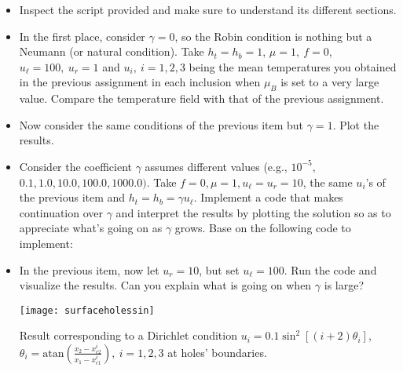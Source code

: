 \begin{kaobox}[frametitle=Implement the following modifications to \texttt{variants\_poisson.py}]

\begin{itemize}
\item Inspect the script provided and make sure to understand its different sections.\\

\item In the first place, consider $\gamma = 0$, so the Robin condition is nothing but a
Neumann (or natural condition). Take $h_t = h_b = 1$, $\mu = 1,~f = 0$, $u_{\ell} = 100,~u_r=1$ and $u_i,~i=1,2,3$ being the mean temperatures 
you obtained in the previous assignment in each inclusion when $\mu_B$ is set to a very
large value. Compare the temperature field with that of the previous assignment.\\

\item Now consider the same conditions of the previous item but $\gamma = 1$. Plot the results.\\

\item Consider the coefficient $\gamma$ assumes different values (e.g., $10^{-5},$ $0.1, 1.0, 10.0, 100.0, 1000.0)$.
Take $f = 0, \mu = 1, u_{\ell} = u_r = 10$, the same $u_i$'s of the previous item and $h_t = h_b = \gamma u_{\ell}$.
Implement a code that makes continuation over $\gamma$ and interpret the results
by plotting the solution so as to appreciate what's going on as $\gamma$ grows.
Base on the following code to implement:
\begin{center}
\begin{minipage}{0.9\textwidth}
    
\end{minipage}
\end{center}

\item In the previous item, now let $u_{r} = 10$, but set $u_{\ell} = 100$. Run the code and visualize the results.
Can you explain what is going on when $\gamma$ is large?

\begin{marginfigure}[-3.0cm]
\begin{center}
\texttt{[image: surfaceholessin]}
\end{center}
\caption[]{Result corresponding to a Dirichlet condition
$u_i = 0.1\sin^2[(i+2)\theta_i]$, $\theta_i = \mbox{atan}\left (\frac{x_2-x_{c2}^i}{x_1-x_{c1}^i} \right),~i=1,2,3$
at holes' boundaries.}
\end{marginfigure}


\end{itemize}
\end{kaobox}
